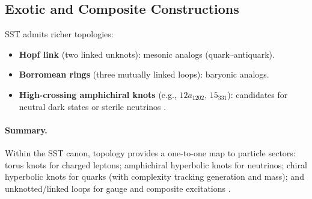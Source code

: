 \documentclass[11pt]{article}
\begin{document}
\subsection{Exotic and Composite Constructions}

SST admits richer topologies:
\begin{itemize}
\item \textbf{Hopf link} (two linked unknots): mesonic analogs (quark–antiquark).
\item \textbf{Borromean rings} (three mutually linked loops): baryonic analogs.
\item \textbf{High-crossing amphichiral knots} (e.g., $12a_{1202}$, $15_{331}$): candidates for neutral dark states or sterile neutrinos \cite{KnotAtlas}.
\end{itemize}

\paragraph{Summary.}
    Within the SST canon, topology provides a one-to-one map to particle sectors: torus knots for charged leptons; amphichiral hyperbolic knots for neutrinos; chiral hyperbolic knots for quarks (with complexity tracking generation and mass); and unknotted/linked loops for gauge and composite excitations \cite{Iskandarani2025Canon,Iskandarani2025Helicity,Iskandarani2025Mass}.


\end{document}
